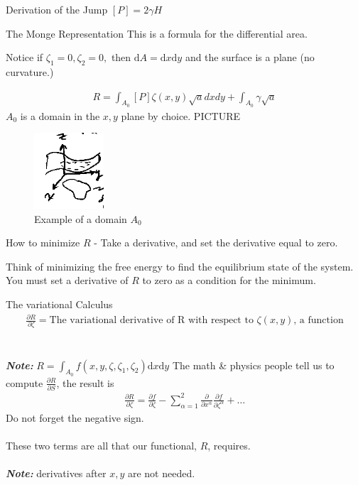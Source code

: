 \documentclass{article}
\renewcommand{\d}[0]{\mathrm{d}}
\newcommand{\note}[1]{\\\\\textbf{\textit{Note: }}#1\\\\}
\begin{document}
\begin{section}{Derivation of the Jump $[P] = 2\gamma H$}
\begin{subsection}{The Monge Representation}
This is a formula for the differential area. 

    Notice if $\zeta_1 = 0, \zeta_2 = 0,$ then $\d A = \d x\d y$ and the surface is a plane (no curvature.)
\end{subsection}

  \begin{align*}
    R  = \int_{A_0} [P]\zeta(x,y) \sqrt{a}dx dy + \int_{A_0} \gamma\sqrt{a}
  \end{align*}
  $A_0$ is a domain in the $x,y$ plane by choice.
  PICTURE
  \begin{figure}
		\centering
		\includegraphics[height=080pt]{aodomain}
  \caption{Example of a domain $A_0$}
\end{figure}
  How to minimize $R$ - Take a derivative, and set the derivative equal to zero.

  Think of minimizing the free energy to find the equilibrium state of the system. You must set a derivative of $R$ to zero as a condition for the minimum.
\end{section}
\begin{section}{The variational Calculus}
  \begin{align*}
    \frac{\partial R}{\partial \zeta} = \text{The variational derivative of R with respect to }\zeta(x,y)\text{, a function}
  \end{align*}
  \note{$R = \int_{A_0} f(x,y,\zeta,\zeta_1,\zeta_2) \d x \d y$ The math \& physics people tell us to compute $\frac{\partial R}{\partial S}$, the result is
	\begin{align*}\frac{\partial R}{\partial \zeta} = \frac{\partial f}{\partial \zeta} - \sum_{\alpha=1}^2 \frac{\partial}{\partial x^\alpha} \frac{\partial f}{\partial \zeta^\alpha} + \dots\end{align*} Do not forget the negative sign.}

	These two terms are all that our functional, $R$, requires. \note{derivatives after $x,y$ are not needed.}
\end{section}
\end{document}
